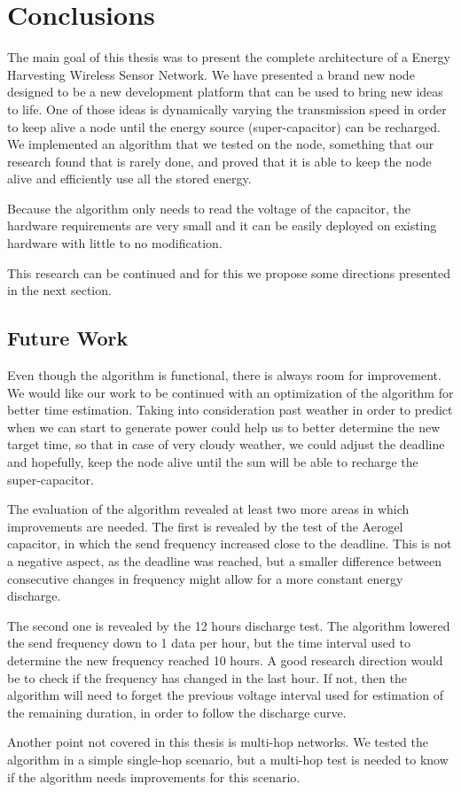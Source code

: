 \chapter{Conclusions}

The main goal of this thesis was to present the complete architecture of a Energy Harvesting Wireless Sensor
Network. We have presented a brand new node designed to be a new development platform that can be used to
bring new ideas to life. One of those ideas is dynamically varying the transmission speed in order to
keep alive a node until the energy source (super-capacitor) can be recharged. We implemented an algorithm that we tested
on the node, something that our research found that is rarely done, and proved that it is able to
keep the node alive and efficiently use all the stored energy.


Because the algorithm only needs to read the voltage of the capacitor, the hardware
requirements are very small and it can be easily deployed on existing hardware with little to no
modification.

This research can be continued and for this we propose some directions presented in the next
section.

\section{Future Work}

Even though the algorithm is functional, there is always room for improvement. We would like our
work to be continued with an optimization of the algorithm for better time estimation. Taking
into consideration past weather in order to predict when we can start to generate power could help us to
better determine the new target time, so that in case of very cloudy weather, we could adjust the
deadline and hopefully, keep the node alive until the sun will be able to recharge the
super-capacitor.

The evaluation of the algorithm revealed at least two more areas in which improvements are
needed. The first is revealed by the test of the Aerogel capacitor, in which the send frequency
increased close to the deadline. This is not a negative aspect, as the deadline was reached, but a smaller difference between
consecutive changes in frequency might allow for a more constant energy discharge.

The second one is revealed by the 12 hours discharge test. The algorithm lowered the send frequency
down to 1 data per hour, but the time interval used to determine the new frequency reached 10 hours.
A good research direction would be to check if the frequency has changed in the last hour. If not,
then the algorithm will need to forget the previous voltage interval used for estimation of the
remaining duration, in order to follow the discharge curve.

Another point not covered in this thesis is multi-hop networks. We tested the algorithm in a simple
single-hop scenario, but a multi-hop test is needed to know if the algorithm needs improvements for
this scenario.
